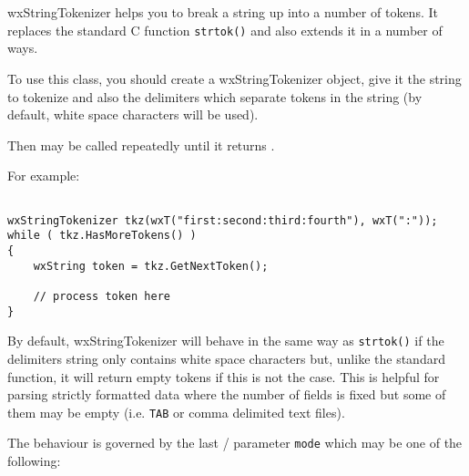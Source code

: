 \section{}\label{wxstringtokenizer}

wxStringTokenizer helps you to break a string up into a number of tokens. It
replaces the standard C function {\tt strtok()} and also extends it in a
number of ways.

To use this class, you should create a wxStringTokenizer object, give it the
string to tokenize and also the delimiters which separate tokens in the string
(by default, white space characters will be used).

Then  may be called
repeatedly until it  
returns \false.

For example:

\begin{verbatim}

wxStringTokenizer tkz(wxT("first:second:third:fourth"), wxT(":"));
while ( tkz.HasMoreTokens() )
{
    wxString token = tkz.GetNextToken();

    // process token here
}
\end{verbatim}

By default, wxStringTokenizer will behave in the same way as {\tt strtok()} if
the delimiters string only contains white space characters but, unlike the
standard function, it will return empty tokens if this is not the case. This
is helpful for parsing strictly formatted data where the number of fields is
fixed but some of them may be empty (i.e. {\tt TAB} or comma delimited text
files).

The behaviour is governed by the last 
/ 
parameter {\tt mode} which may be one of the following:

\twocolwidtha{5cm}%
\begin{twocollist}\itemsep=0pt
\end{twocollist}

